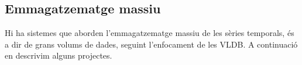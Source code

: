 




\subsection{Emmagatzematge massiu}

Hi ha sistemes que aborden l'emmagatzematge massiu de les
sèries temporals, és a dir de grans volums de dades, seguint
l'enfocament de les \gls{VLDB}.  A continuació en descrivim alguns
projectes.



